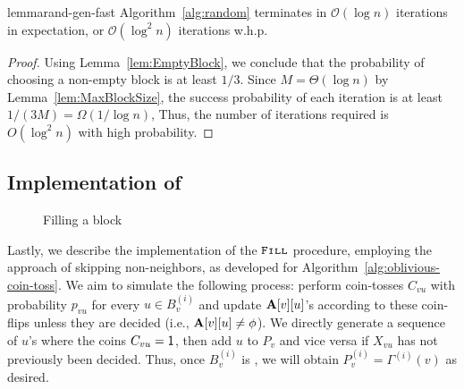 \begin{restatable}{lemma}{rand-gen-fast}
\label{lem:rand_gen_fast}
Algorithm~\ref{alg:random} terminates in $\mathcal{O}(\log n)$ iterations in expectation, or $\mathcal{O}(\log^2 n)$ iterations w.h.p.
\end{restatable}
\begin{proof}
Using Lemma~\ref{lem:EmptyBlock}, we conclude that
the probability of choosing a non-empty block is at least $1/3$.
Since $M = \Theta(\log n)$ by Lemma~\ref{lem:MaxBlockSize}, the success probability of each iteration is at least $1/(3M)=\Omega(1/\log n)$,
Thus, the number of iterations required is $O(\log^2 n)$ with high probability.
\end{proof}





\subsection{Implementation of }
\label{sec:fill_implement}

\begin{wrapfigure}[13]{R}{0.39\textwidth}
\vspace{-1.75em}
\begin{framed}
    \renewcommand\figurename{Algorithm}
    \caption{Filling a block}
    \label{alg:fill}
    \begin{algorithmic}
                \EndIf
            \EndWhile
    \EndProcedure
    \end{algorithmic}
\end{framed}
\end{wrapfigure}

Lastly, we describe the implementation of the $\texttt{\textsc{Fill}}$ procedure, employing the approach of skipping non-neighbors, as developed for Algorithm~\ref{alg:oblivious-coin-toss}. We aim to simulate the following process: perform coin-tosses $C_{vu}$ with probability $p_{vu}$ for every $u \in B^{(i)}_v$ and update $\mathbf{A}[v][u]$'s according to these coin-flips unless they are decided (i.e., $\mathbf{A}[v][u] \neq \phi$). We directly generate a sequence of $u$'s where the coins $C_{vu} = \mathsf{1}$, then add $u$ to $P_v$ and vice versa if $X_{vu}$ has not previously been decided. Thus, once $B^{(i)}_v$ is \filled, we will obtain $P_v^{(i)} = \Gamma^{(i)}(v)$ as desired.


